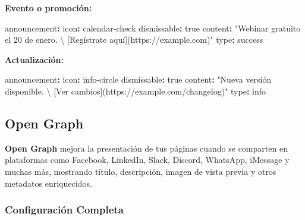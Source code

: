 \documentclass[
  doc,
  floatsintext,
  longtable,
  a4paper,
  nolmodern,
  notxfonts,
  notimes,
  12pt,
  colorlinks=true,linkcolor=blue,citecolor=blue,urlcolor=blue]{apa7}
\newenvironment{Shaded}{\begin{snugshade}}{\end{snugshade}}
\newcommand{\AttributeTok}[1]{\textcolor[rgb]{0.40,0.45,0.13}{#1}}
\newcommand{\CharTok}[1]{\textcolor[rgb]{0.13,0.47,0.30}{#1}}
\newcommand{\FunctionTok}[1]{\textcolor[rgb]{0.28,0.35,0.67}{#1}}
\newcommand{\KeywordTok}[1]{\textcolor[rgb]{0.00,0.23,0.31}{\textbf{#1}}}
\newcommand{\StringTok}[1]{\textcolor[rgb]{0.13,0.47,0.30}{#1}}
\begin{document}
\textbf{Evento o promoción:}

\begin{Shaded}
\begin{Highlighting}[]
\FunctionTok{announcement}\KeywordTok{:}
\AttributeTok{  }\FunctionTok{icon}\KeywordTok{:}\AttributeTok{ calendar{-}check}
\AttributeTok{  }\FunctionTok{dismissable}\KeywordTok{:}\AttributeTok{ }\CharTok{true}
\AttributeTok{  }\FunctionTok{content}\KeywordTok{:}\AttributeTok{ }\StringTok{"Webinar gratuito el 20 de enero. \textbackslash{}}
\StringTok{  [Regístrate aquí](https://example.com)"}
\AttributeTok{  }\FunctionTok{type}\KeywordTok{:}\AttributeTok{ success}
\end{Highlighting}
\end{Shaded}

\textbf{Actualización:}

\begin{Shaded}
\begin{Highlighting}[]
\FunctionTok{announcement}\KeywordTok{:}
\AttributeTok{  }\FunctionTok{icon}\KeywordTok{:}\AttributeTok{ info{-}circle}
\AttributeTok{  }\FunctionTok{dismissable}\KeywordTok{:}\AttributeTok{ }\CharTok{true}
\AttributeTok{  }\FunctionTok{content}\KeywordTok{:}\AttributeTok{ }\StringTok{"Nueva versión disponible. \textbackslash{}}
\StringTok{  [Ver cambios](https://example.com/changelog)"}
\AttributeTok{  }\FunctionTok{type}\KeywordTok{:}\AttributeTok{ info}
\end{Highlighting}
\end{Shaded}

\subsection{Open Graph}\label{open-graph}

\textbf{Open Graph} mejora la presentación de tus páginas cuando se
comparten en plataformas como Facebook, LinkedIn, Slack, Discord,
WhatsApp, iMessage y muchas más, mostrando título, descripción, imagen
de vista previa y otros metadatos enriquecidos.

\subsubsection{Configuración
Completa}\label{configuraciuxf3n-completa-1}
\end{document}
